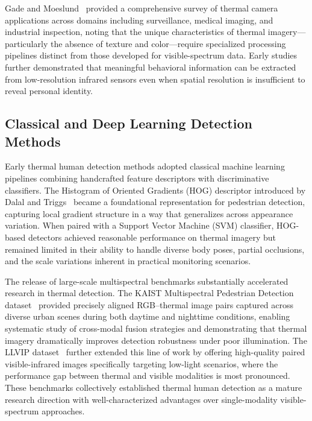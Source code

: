 Gade and Moeslund~\cite{gade2014thermal} provided a comprehensive survey of thermal camera applications across domains including surveillance, medical imaging, and industrial inspection, noting that the unique characteristics of thermal imagery---particularly the absence of texture and color---require specialized processing pipelines distinct from those developed for visible-spectrum data. Early studies further demonstrated that meaningful behavioral information can be extracted from low-resolution infrared sensors even when spatial resolution is insufficient to reveal personal identity.

\subsection*{Classical and Deep Learning Detection Methods}

Early thermal human detection methods adopted classical machine learning pipelines combining handcrafted feature descriptors with discriminative classifiers. The Histogram of Oriented Gradients (HOG) descriptor introduced by Dalal and Triggs~\cite{dalal2005hog} became a foundational representation for pedestrian detection, capturing local gradient structure in a way that generalizes across appearance variation. When paired with a Support Vector Machine (SVM) classifier, HOG-based detectors achieved reasonable performance on thermal imagery but remained limited in their ability to handle diverse body poses, partial occlusions, and the scale variations inherent in practical monitoring scenarios.

The release of large-scale multispectral benchmarks substantially accelerated research in thermal detection. The KAIST Multispectral Pedestrian Detection dataset~\cite{hwang2015kaist} provided precisely aligned RGB--thermal image pairs captured across diverse urban scenes during both daytime and nighttime conditions, enabling systematic study of cross-modal fusion strategies and demonstrating that thermal imagery dramatically improves detection robustness under poor illumination. The LLVIP dataset~\cite{jia2021llvip} further extended this line of work by offering high-quality paired visible-infrared images specifically targeting low-light scenarios, where the performance gap between thermal and visible modalities is most pronounced. These benchmarks collectively established thermal human detection as a mature research direction with well-characterized advantages over single-modality visible-spectrum approaches.

